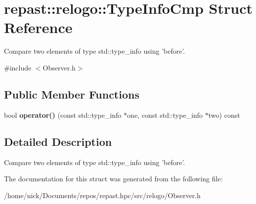 \hypertarget{structrepast_1_1relogo_1_1_type_info_cmp}{\section{repast\-:\-:relogo\-:\-:Type\-Info\-Cmp Struct Reference}
\label{structrepast_1_1relogo_1_1_type_info_cmp}
}


Compare two elements of type std\-::type\-\_\-info using 'before'.  




{\ttfamily \#include $<$Observer.\-h$>$}

\subsection*{Public Member Functions}
\begin{DoxyCompactItemize}
\item 
\hypertarget{structrepast_1_1relogo_1_1_type_info_cmp_a4f70174d8421af1c26beb5ae9eb5059e}{bool {\bfseries operator()} (const std\-::type\-\_\-info $\ast$one, const std\-::type\-\_\-info $\ast$two) const }\label{structrepast_1_1relogo_1_1_type_info_cmp_a4f70174d8421af1c26beb5ae9eb5059e}

\end{DoxyCompactItemize}


\subsection{Detailed Description}
Compare two elements of type std\-::type\-\_\-info using 'before'. 

The documentation for this struct was generated from the following file\-:\begin{DoxyCompactItemize}
\item 
/home/nick/\-Documents/repos/repast.\-hpc/src/relogo/Observer.\-h\end{DoxyCompactItemize}

